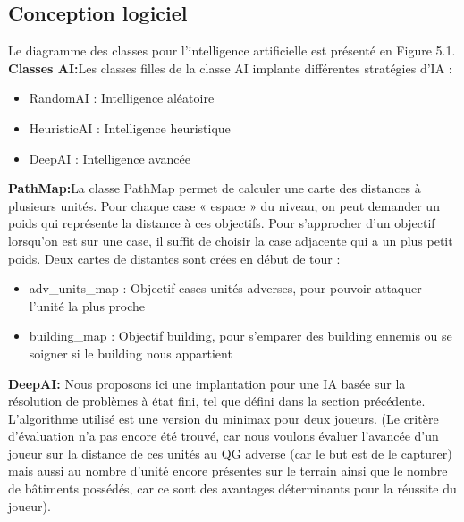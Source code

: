 \documentclass[12pt]{report}
\begin{document}
\begin{itemize}
\section{Conception logiciel}
\paragraphe{}Le diagramme des classes pour l’intelligence artificielle est présenté en Figure 5.1.
\paragraphe{}\textbf{Classes AI:}Les classes filles de la classe AI implante différentes stratégies d’IA :
\begin{itemize}
    \item RandomAI : Intelligence aléatoire
    \item HeuristicAI : Intelligence heuristique
     \item DeepAI : Intelligence avancée
\end{itemize}
\paragraphe{}\textbf{PathMap:}La classe PathMap permet de calculer une carte des distances à plusieurs unités. Pour chaque case « espace » du niveau, on peut demander un poids qui représente la distance à ces objectifs. Pour s’approcher d’un objectif lorsqu’on est sur une case, il suffit de choisir la case
adjacente qui a un plus petit poids. Deux cartes de distantes
sont crées en début de tour :
\begin{itemize}
    \item adv\_units\_map : Objectif cases unités adverses, pour pouvoir attaquer l'unité la plus proche
    \item building\_map : Objectif building, pour s’emparer des building ennemis ou se soigner si le building nous appartient
\end{itemize}

\paragraphe{}\textbf{DeepAI:} Nous proposons ici une implantation pour une IA basée sur la résolution de problèmes à état ﬁni, tel que déﬁni dans la section précédente. L’algorithme utilisé est une version du minimax pour deux joueurs. 
\newline (Le critère d'évaluation n'a pas encore été trouvé, car nous voulons évaluer l'avancée d'un joueur sur la distance de ces unités au QG adverse (car le but est de le capturer) mais aussi au nombre d'unité encore présentes sur le terrain ainsi que le nombre de bâtiments possédés, car ce sont des avantages déterminants pour la réussite du joueur).
\end{itemize}
\end{document}
